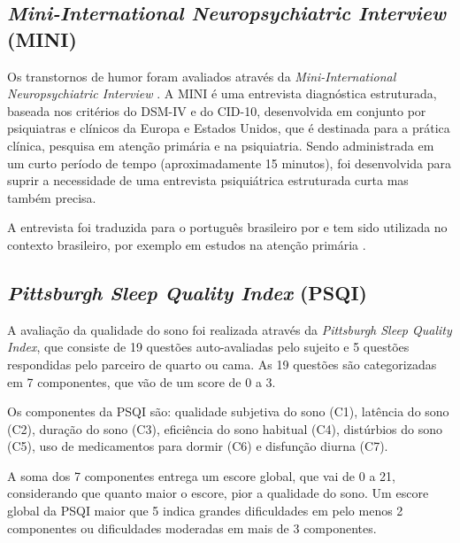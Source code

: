 \documentclass[chapter=TITLE,
               oneside,
               12pt,
               a4paper,
               english,
               brazil]{abntex2}    %
\begin{document}
        \subsection{\textit{Mini-International Neuropsychiatric Interview} (MINI)}
        \label{sec:mini}
    
            Os transtornos de humor foram avaliados através da
            \textit{Mini-International Neuropsychiatric Interview}
            \parencite{sheehan_mini-international_1998}.
            A MINI é uma entrevista diagnóstica estruturada,
            baseada nos critérios do DSM-IV e do CID-10,
            desenvolvida em conjunto por psiquiatras e clínicos
            da Europa e Estados Unidos,
            que é destinada para a prática clínica, pesquisa em atenção primária
            e na psiquiatria.
            Sendo administrada em um curto período de tempo (aproximadamente 15 minutos),
            foi desenvolvida para suprir a necessidade de uma entrevista psiquiátrica
            estruturada curta mas também precisa.
    
            A entrevista foi traduzida para o português brasileiro por
            \textcite{amorim_mini_2000} e tem sido utilizada no contexto
            brasileiro, por exemplo em estudos na atenção primária
            \parencite{de_azevedo_marques_validity_2008}.
    
        \subsection{\textit{Pittsburgh Sleep Quality Index} (PSQI)}
        \label{sec:psqi}
    
            A avaliação da qualidade do sono foi realizada através da
            \textit{Pittsburgh Sleep Quality Index}, que consiste de 19 questões
            auto-avaliadas pelo sujeito e 5 questões respondidas pelo parceiro de
            quarto ou cama. 
            As 19 questões são categorizadas em 7 componentes, que vão de um score
            de 0 a 3.
            \parencite{bertolazi_validation_2011}
    
            Os componentes da PSQI são: qualidade subjetiva do sono (C1),
            latência do sono (C2), duração do sono (C3),
            eficiência do sono habitual (C4), distúrbios do sono (C5),
            uso de medicamentos para dormir (C6) e disfunção diurna (C7).
    
            A soma dos 7 componentes entrega um escore global, que vai de 0 a 21,
            considerando que quanto maior o escore, pior a qualidade do sono.
            Um escore global da PSQI maior que 5 indica grandes dificuldades
            em pelo menos 2 componentes ou dificuldades moderadas
            em mais de 3 componentes.
    
\end{document}
